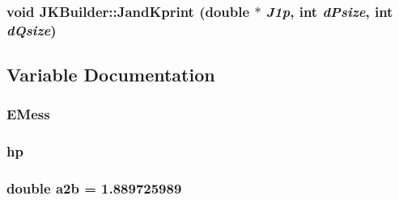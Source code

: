 \label{namespaceJKBuilder_a6935fce10a29a2d7c6ebcdb26fded20f}
\hypertarget{namespaceJKBuilder_afeb5f113e0e9c0ed41051e80f2f92271}{
\subsubsection[{JandKprint}]{\setlength{\rightskip}{0pt plus 5cm}void JKBuilder::JandKprint (double $\ast$ {\em J1p}, \/  int {\em dPsize}, \/  int {\em dQsize})}}
\label{namespaceJKBuilder_afeb5f113e0e9c0ed41051e80f2f92271}


\subsection{Variable Documentation}
\hypertarget{namespaceJKBuilder_aad24947c8da52c249281295b850dec83}{
\subsubsection[{EMess}]{ {\bf EMess}}}
\label{namespaceJKBuilder_aad24947c8da52c249281295b850dec83}
\hypertarget{namespaceJKBuilder_a7ee4aa020c4d01e7c8355be5805e47a9}{
\subsubsection[{hp}]{ {\bf hp}}}
\label{namespaceJKBuilder_a7ee4aa020c4d01e7c8355be5805e47a9}
\hypertarget{namespaceJKBuilder_a37aaee68153498610114658cc91dab66}{
\subsubsection[{a2b}]{\setlength{\rightskip}{0pt plus 5cm}double {\bf a2b} = 1.889725989}}
\label{namespaceJKBuilder_a37aaee68153498610114658cc91dab66}
